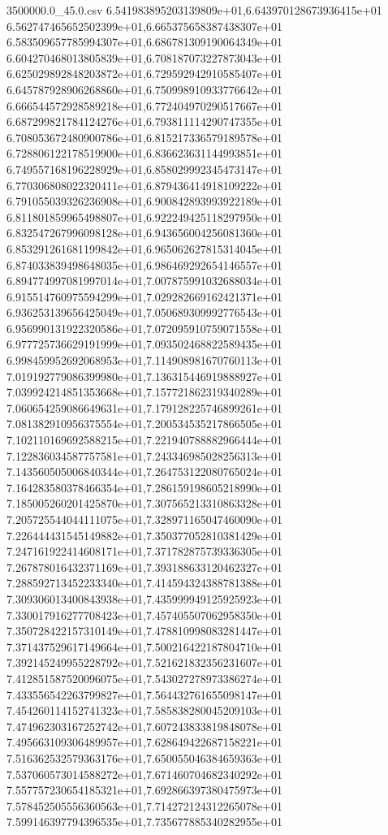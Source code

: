 \begin{filecontents*}{3500000.0_45.0.csv}
6.541983895203139809e+01,6.643970128673936415e+01
6.562747465652502399e+01,6.665375658387438307e+01
6.583509657785994307e+01,6.686781309190064349e+01
6.604270468013805839e+01,6.708187073227873043e+01
6.625029892848203872e+01,6.729592942910585407e+01
6.645787928906268860e+01,6.750998910933776642e+01
6.666544572928589218e+01,6.772404970290517667e+01
6.687299821784124276e+01,6.793811114290747355e+01
6.708053672480900786e+01,6.815217336579189578e+01
6.728806122178519900e+01,6.836623631144993851e+01
6.749557168196228929e+01,6.858029992345473147e+01
6.770306808022320411e+01,6.879436414918109222e+01
6.791055039326236908e+01,6.900842893993922189e+01
6.811801859965498807e+01,6.922249425118297950e+01
6.832547267996098128e+01,6.943656004256081360e+01
6.853291261681199842e+01,6.965062627815314045e+01
6.874033839498648035e+01,6.986469292654146557e+01
6.894774997081997014e+01,7.007875991032688034e+01
6.915514760975594299e+01,7.029282669162421371e+01
6.936253139656425049e+01,7.050689309992776543e+01
6.956990131922320586e+01,7.072095910759071558e+01
6.977725736629191999e+01,7.093502468822589435e+01
6.998459952692068953e+01,7.114908981670760113e+01
7.019192779086399980e+01,7.136315446919888927e+01
7.039924214851353668e+01,7.157721862319340289e+01
7.060654259086649631e+01,7.179128225746899261e+01
7.081382910956375554e+01,7.200534535217866505e+01
7.102110169692588215e+01,7.221940788882966444e+01
7.122836034587757581e+01,7.243346985028256313e+01
7.143560505006840344e+01,7.264753122080765024e+01
7.164283580378466354e+01,7.286159198605218990e+01
7.185005260201425870e+01,7.307565213310863328e+01
7.205725544044111075e+01,7.328971165047460090e+01
7.226444431545149882e+01,7.350377052810381429e+01
7.247161922414608171e+01,7.371782875739336305e+01
7.267878016432371169e+01,7.393188633120462327e+01
7.288592713452233340e+01,7.414594324388781388e+01
7.309306013400843938e+01,7.435999949125925923e+01
7.330017916277708423e+01,7.457405507062958350e+01
7.350728422157310149e+01,7.478810998083281447e+01
7.371437529617149664e+01,7.500216422187804710e+01
7.392145249955228792e+01,7.521621832356231607e+01
7.412851587520096075e+01,7.543027278973386274e+01
7.433556542263799827e+01,7.564432761655098147e+01
7.454260114152741323e+01,7.585838280045209103e+01
7.474962303167252742e+01,7.607243833819848078e+01
7.495663109306489957e+01,7.628649422687158221e+01
7.516362532579363176e+01,7.650055046384659363e+01
7.537060573014588272e+01,7.671460704682340292e+01
7.557757230654185321e+01,7.692866397380475973e+01
7.578452505556360563e+01,7.714272124312265078e+01
7.599146397794396535e+01,7.735677885340282955e+01

\end{filecontents*}

